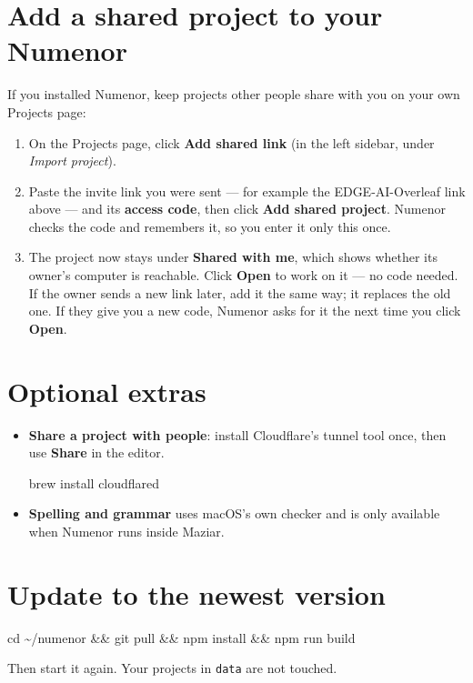\documentclass[11pt,a4paper]{article}
\begin{document}
\section{Add a shared project to your Numenor}
If you installed Numenor, keep projects other people share with you on your own Projects page:
\begin{enumerate}[leftmargin=1.4em,itemsep=0.2em]
\item On the Projects page, click \textbf{Add shared link} (in the left sidebar, under \emph{Import project}).
\item Paste the invite link you were sent --- for example the EDGE-AI-Overleaf link above --- and its \textbf{access code},
then click \textbf{Add shared project}. Numenor checks the code and remembers it, so you enter it only this once.
\item The project now stays under \textbf{Shared with me}, which shows whether its owner's computer is reachable.
Click \textbf{Open} to work on it --- no code needed. If the owner sends a new link later, add it the same way; it replaces the old one.
If they give you a new code, Numenor asks for it the next time you click \textbf{Open}.
\end{enumerate}

\section{Optional extras}
\begin{itemize}[leftmargin=1.2em,itemsep=0.2em]
\item \textbf{Share a project with people}: install Cloudflare's tunnel tool once, then use \textbf{Share} in the editor.
\begin{term}
brew install cloudflared
\end{term}
\item \textbf{Spelling and grammar} uses macOS's own checker and is only available when Numenor runs inside Maziar.
\end{itemize}

\section{Update to the newest version}
\begin{term}
cd \textasciitilde/numenor \&\& git pull \&\& npm install \&\& npm run build
\end{term}
Then start it again. Your projects in \texttt{data} are not touched.
\end{document}
